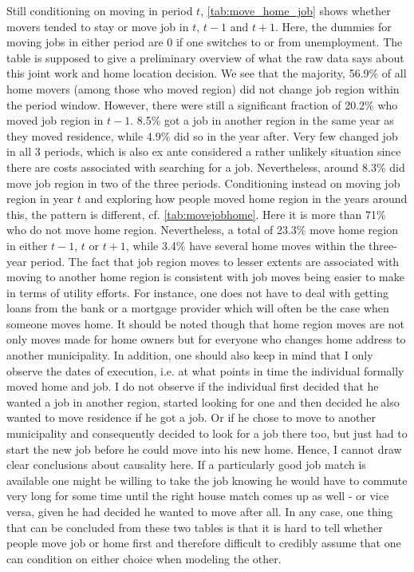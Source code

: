 Still conditioning on moving in period $t$, \autoref{tab:move_home_job} shows whether movers tended to stay or move job in $t$, $t-1$ and $t+1$. Here, the dummies for moving jobs in either period are 0 if one switches to or from unemployment. The table is supposed to give a preliminary overview of what the raw data says about this joint work and home location decision. We see that the majority, 56.9\% of all home movers (among those who moved region) did not change job region within the period window. However, there were still a significant fraction of 20.2\% who moved job region in $t-1$. 8.5\% got a job in another region in the same year as they moved residence, while 4.9\% did so in the year after. Very few changed job in all 3 periods, which is also ex ante considered a rather unlikely situation since there are costs associated with searching for a job. Nevertheless, around 8.3\% did move job region in two of the three periods. Conditioning instead on moving job region in year $t$ and exploring how people moved home region in the years around this, the pattern is different, cf. \autoref{tab:movejobhome}. Here it is more than 71\% who do not move home region. Nevertheless, a total of 23.3\% move home region in either $t-1$, $t$ or $t+1$, while 3.4\% have several home moves within the three-year period. The fact that job region moves to lesser extents are associated with moving to another home region is consistent with job moves being easier to make in terms of utility efforts. For instance, one does not have to deal with getting loans from the bank or a mortgage provider which will often be the case when someone moves home. It should be noted though that home region moves are not only moves made for home owners but for everyone who changes home address to another municipality. In addition, one should also keep in mind that I only observe the dates of execution, i.e. at what points in time the individual formally moved home and job. I do not observe if the individual first decided that he wanted a job in another region, started looking for one and then decided he also wanted to move residence if he got a job. Or if he chose to move to another municipality and consequently decided to look for a job there too, but just had to start the new job before he could move into his new home. Hence, I cannot draw clear conclusions about causality here. If a particularly good job match is available one might be willing to take the job knowing he would have to commute very long for some time until the right house match comes up as well - or vice versa, given he had decided he wanted to move after all. In any case, one thing that can be concluded from these two tables is that it is hard to tell whether people move job or home first and therefore difficult to credibly assume that one can condition on either choice when modeling the other. 

